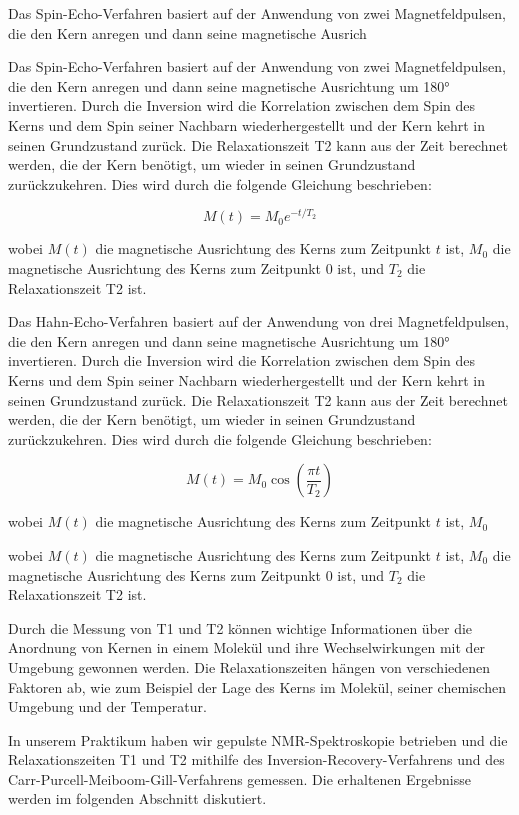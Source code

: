 Das Spin-Echo-Verfahren basiert auf der Anwendung 
von zwei Magnetfeldpulsen, die den Kern anregen 
und dann seine magnetische Ausrich



Das Spin-Echo-Verfahren basiert auf der Anwendung 
von zwei Magnetfeldpulsen, die den Kern anregen 
und dann seine magnetische Ausrichtung um 180° 
invertieren. Durch die Inversion wird die Korrelation
 zwischen dem Spin des Kerns und dem Spin 
 seiner Nachbarn wiederhergestellt und der Kern 
 kehrt in seinen Grundzustand zurück. Die 
 Relaxationszeit T2 kann aus der Zeit berechnet 
 werden, die der Kern benötigt, um wieder in 
 seinen Grundzustand zurückzukehren. Dies wird 
 durch die folgende Gleichung beschrieben:

\begin{equation}
M(t) = M_0 e^{-t/T_2}
\end{equation}

wobei $M(t)$ die magnetische Ausrichtung des 
Kerns zum Zeitpunkt $t$ ist, $M_0$ die magnetische
 Ausrichtung des Kerns zum Zeitpunkt 0 ist, und 
 $T_2$ die Relaxationszeit T2 ist.

Das Hahn-Echo-Verfahren basiert auf der 
Anwendung von drei Magnetfeldpulsen, die den 
Kern anregen und dann seine magnetische 
Ausrichtung um 180° invertieren. Durch die 
Inversion wird die Korrelation zwischen dem 
Spin des Kerns und dem Spin seiner Nachbarn 
wiederhergestellt und der Kern kehrt in 
seinen Grundzustand zurück. Die Relaxationszeit 
T2 kann aus der Zeit berechnet werden, 
die der Kern benötigt, um wieder in seinen 
Grundzustand zurückzukehren. Dies wird 
durch die folgende Gleichung beschrieben:

\begin{equation}
M(t) = M_0 \cos \left( \frac{\pi t}{T_2} \right)
\end{equation}

wobei $M(t)$ die magnetische Ausrichtung 
des Kerns zum Zeitpunkt $t$ ist, $M_0$



wobei $M(t)$ die magnetische Ausrichtung 
des Kerns zum Zeitpunkt $t$ ist, $M_0$ 
die magnetische Ausrichtung des Kerns zum
 Zeitpunkt 0 ist, und $T_2$ die Relaxationszeit T2 ist.

Durch die Messung von T1 und T2 können 
wichtige Informationen über die Anordnung
 von Kernen in einem Molekül und ihre 
 Wechselwirkungen mit der Umgebung gewonnen 
 werden. Die Relaxationszeiten hängen 
 von verschiedenen Faktoren ab, wie zum 
 Beispiel der Lage des Kerns im Molekül, 
 seiner chemischen Umgebung und der Temperatur.

In unserem Praktikum haben wir gepulste
 NMR-Spektroskopie betrieben und die 
 Relaxationszeiten T1 und T2 mithilfe des 
 Inversion-Recovery-Verfahrens und 
 des Carr-Purcell-Meiboom-Gill-Verfahrens 
 gemessen. Die erhaltenen Ergebnisse 
 werden im folgenden Abschnitt diskutiert.


